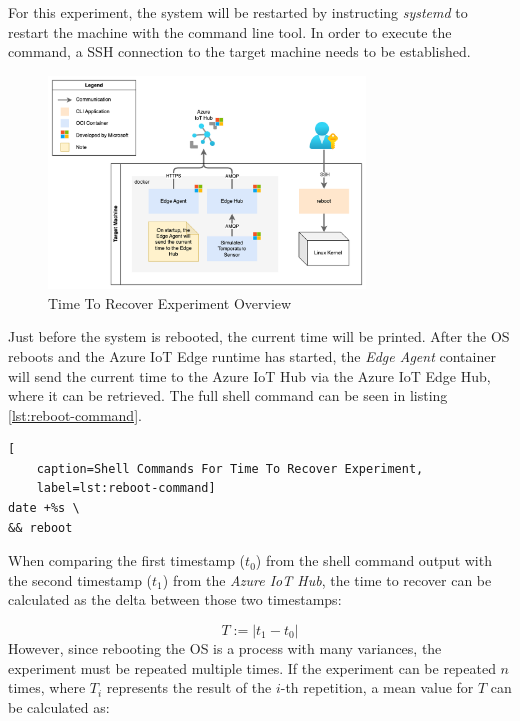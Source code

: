For this experiment, the system will be restarted by instructing \textit{systemd}
to restart the machine with the  command line tool.
In order to execute the command, a \ac{SSH} connection to the target machine
needs to be established.

\begin{figure}[H]
    \centering
    \includegraphics[width=0.75\textwidth]{fig/reboot-setup.drawio.png}
    \caption{Time To Recover Experiment Overview}
\end{figure}

\noindent
Just before the system is rebooted, the current time will be printed.
After the \ac{OS} reboots and the Azure IoT Edge runtime has started, the
\textit{Edge Agent} container will send the current time to the Azure IoT Hub via
the Azure IoT Edge Hub, where it can be retrieved. The full shell command can
be seen in listing \ref{lst:reboot-command}.
\\

\begin{lstlisting}[
    caption=Shell Commands For Time To Recover Experiment,
    label=lst:reboot-command]
date +%s \
&& reboot
\end{lstlisting}

\noindent
When comparing the first timestamp ($t_0$) from the shell command output with the second
timestamp ($t_1$) from the \textit{Azure IoT Hub}, the time to recover can be calculated
as the delta between those two timestamps:

\begin{equation}
    T := |t_1 - t_0|
\end{equation}
However, since rebooting the \ac{OS} is a process with many variances, the experiment
must be repeated multiple times. If the experiment can be repeated $n$ times, where
$T_i$ represents the result of the $i$-th repetition, a mean value for $T$ can be
calculated as:


